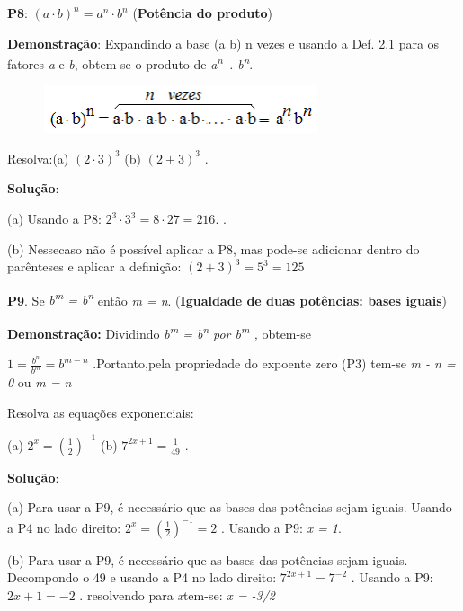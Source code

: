 \begin{caixa}
\textbf{P8}:  \(  \left( a \cdot b \right) ^{n}=a^{n} \cdot b^{n} \)  (\textbf{Potência do produto})
\end{caixa}

\textbf{Demonstração}: Expandindo a base (a b) n vezes e usando a Def. 2.1 para os fatores \textit{a} e \textit{b}, obtem-se o produto de \textit{a\textsuperscript{n} . b\textsuperscript{n}}.

\begin{figure}[H]
	\begin{Center}
		\includegraphics[width=3.18in,height=0.55in]{capitulos/potencias_e_funcoes_exponenciais/media/image7.png}
	\end{Center}
\end{figure}

\qedsymbol{}

\begin{texemplo}
Resolva:(a)   \(  \left( 2 \cdot 3 \right) ^{3} \)  (b) \(   \left( 2+3 \right) ^{3} \) .

\textbf{Solução}: 

 (a) Usando a P8:  \( 2^{3} \cdot 3^{3}=8  \cdot 27=216. \)  .

 (b) Nessecaso não é possível aplicar a P8, mas pode-se adicionar dentro do parênteses e aplicar a definição:   \(  \left( 2+3 \right) ^{3}=5^{3}=125 \)  \qedsymbol{}
\end{texemplo}

\begin{caixa}
\textbf{P9}. Se \textit{b\textsuperscript{m} = b\textsuperscript{n}} então \textit{m = n}. (\textbf{Igualdade de duas potências: bases iguais})
\end{caixa}

\textbf{Demonstração: }Dividindo \textit{b\textsuperscript{m} = b\textsuperscript{n} por b\textsuperscript{m} , }obtem-se

  \( 1=\frac{b^{n}}{b^{m}}= b^{m-n} \) .Portanto,pela propriedade do expoente zero (P3) tem-se   \textit{m - n = 0} ou \textit{m = n} \qedsymbol{}

\begin{texemplo}
Resolva as equações exponenciais: 

 (a)  \( 2^{x}= \left( \frac{1}{2} \right) ^{-1} \)  (b) \(  7^{2x+1}=\frac{1}{49} \) .

\textbf{Solução}: 

 (a) Para usar a P9, é necessário que as bases das potências sejam iguais.  Usando a P4 no lado direito:  \( 2^{x}= \left( \frac{1}{2} \right) ^{-1}=2 \) . Usando a P9: \textit{x = 1}.

 (b) Para usar a P9, é necessário que as bases das potências sejam iguais.  Decompondo o 49 e usando a P4 no lado direito:  \( 7^{2x+1}=7^{-2} \)  . Usando a  P9:   \( 2x+1=-2 \)  . resolvendo para \textit{x}tem-se:  \textit{x = -3/2} \qedsymbol{}
\end{texemplo}

